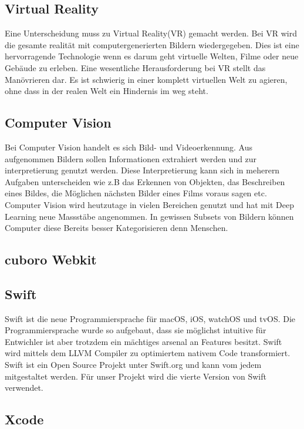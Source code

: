 \subsection{Virtual Reality}
Eine Unterscheidung muss zu Virtual Reality(VR) gemacht werden. Bei VR wird die gesamte realität mit computergenerierten Bildern wiedergegeben. Dies ist eine hervorragende Technologie wenn es darum geht virtuelle Welten, Filme oder neue Gebäude zu erleben. Eine wesentliche Herausforderung bei VR stellt das Manövrieren dar. Es ist schwierig in einer komplett virtuellen Welt zu agieren, ohne dass in der realen Welt ein Hindernis im weg steht.

\subsection{Computer Vision}
Bei Computer Vision handelt es sich Bild- und Videoerkennung. Aus aufgenommen Bildern sollen Informationen extrahiert werden und zur interpretierung genutzt werden. Diese Interpretierung kann sich in meherern Aufgaben unterscheiden wie z.B das Erkennen von Objekten, das Beschreiben eines Bildes, die Möglichen nächsten Bilder eines Films voraus sagen etc. Computer Vision wird heutzutage in vielen Bereichen genutzt und hat mit Deep Learning neue Massstäbe angenommen. In gewissen Subsets von Bildern können Computer diese Bereits besser Kategorisieren denn Menschen.

\subsection{cuboro Webkit}

\subsection{Swift}
Swift ist die neue Programmiersprache für macOS, iOS, watchOS und tvOS. Die Programmiersprache wurde so aufgebaut, dass sie möglichst intuitive für Entwichler ist aber trotzdem ein mächtiges arsenal an Features besitzt. Swift wird mittels dem LLVM Compiler zu optimiertem nativem Code transformiert. Swift ist ein Open Source Projekt unter Swift.org und kann vom jedem mitgestaltet werden. Für unser Projekt wird die vierte Version von Swift verwendet.


\subsection{Xcode}
